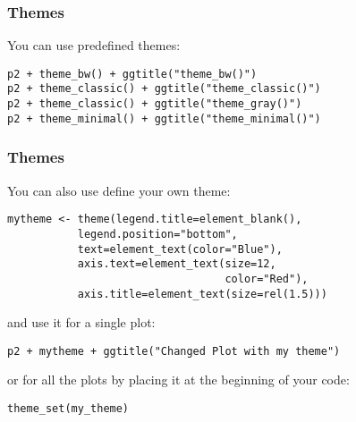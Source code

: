\documentclass{beamer}
\begin{document}
	\begin{frame}[fragile]
		\frametitle{Themes}

		You can use predefined themes:

		\vspace{2em}

		\begin{exampleblock}{}
		\begin{BVerbatim}
p2 + theme_bw() + ggtitle("theme_bw()")
p2 + theme_classic() + ggtitle("theme_classic()")
p2 + theme_classic() + ggtitle("theme_gray()")
p2 + theme_minimal() + ggtitle("theme_minimal()")
		\end{BVerbatim}
		\end{exampleblock}{}

	\end{frame}

	\begin{frame}[fragile]
		\frametitle{Themes}

		You can also use define your own theme:

		\begin{exampleblock}{}
		\begin{BVerbatim}
mytheme <- theme(legend.title=element_blank(),
           legend.position="bottom",
           text=element_text(color="Blue"),
           axis.text=element_text(size=12,
                                  color="Red"),
           axis.title=element_text(size=rel(1.5)))
		\end{BVerbatim}
		\end{exampleblock}{}

		and use it for a single plot:

		\begin{exampleblock}{}
		\begin{BVerbatim}
p2 + mytheme + ggtitle("Changed Plot with my theme")
		\end{BVerbatim}
		\end{exampleblock}{}

		or for all the plots by placing it at the beginning of your code:

		\begin{exampleblock}{}
		\begin{BVerbatim}
theme_set(my_theme)
		\end{BVerbatim}
		\end{exampleblock}{}

	\end{frame}
\end{document}
